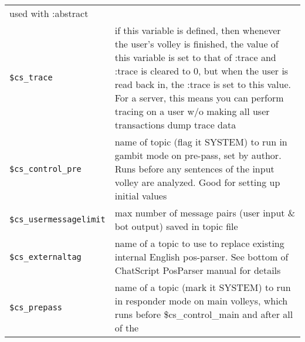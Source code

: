 \documentclass[]{article}
\begin{document}
\begin{longtable}[]{@{}ll@{}}
\begin{minipage}[t]{0.10\columnwidth}
used with :abstract\strut
\end{minipage}\tabularnewline
\begin{minipage}[t]{0.26\columnwidth}\raggedright\strut
\texttt{\$cs\_trace}\strut
\end{minipage} & \begin{minipage}[t]{0.10\columnwidth}\raggedright\strut
if this variable is defined, then whenever the user's volley is
finished, the value of this variable is set to that of :trace and :trace
is cleared to 0, but when the user is read back in, the :trace is set to
this value. For a server, this means you can perform tracing on a user
w/o making all user transactions dump trace data\strut
\end{minipage}\tabularnewline
\begin{minipage}[t]{0.26\columnwidth}\raggedright\strut
\texttt{\$cs\_control\_pre}\strut
\end{minipage} & \begin{minipage}[t]{0.10\columnwidth}\raggedright\strut
name of topic (flag it SYSTEM) to run in gambit mode on pre-pass, set by
author. Runs before any sentences of the input volley are analyzed. Good
for setting up initial values\strut
\end{minipage}\tabularnewline
\begin{minipage}[t]{0.26\columnwidth}\raggedright\strut
\texttt{\$cs\_usermessagelimit}\strut
\end{minipage} & \begin{minipage}[t]{0.10\columnwidth}\raggedright\strut
max number of message pairs (user input \& bot output) saved in topic
file\strut
\end{minipage}\tabularnewline
\begin{minipage}[t]{0.26\columnwidth}\raggedright\strut
\texttt{\$cs\_externaltag}\strut
\end{minipage} & \begin{minipage}[t]{0.10\columnwidth}\raggedright\strut
name of a topic to use to replace existing internal English pos-parser.
See bottom of ChatScript PosParser manual for details\strut
\end{minipage}\tabularnewline
\begin{minipage}[t]{0.26\columnwidth}\raggedright\strut
\texttt{\$cs\_prepass}\strut
\end{minipage} & \begin{minipage}[t]{0.10\columnwidth}\raggedright\strut
name of a topic (mark it SYSTEM) to run in responder mode on main
volleys, which runs before \$cs\_control\_main and after all of the

\end{minipage}
\end{longtable}
\end{document}
